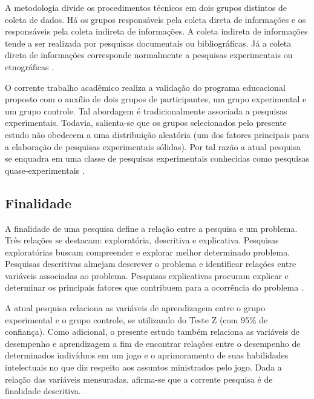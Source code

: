 A metodologia divide os procedimentos técnicos em dois grupos distintos de coleta de dados. Há os grupos responsáveis pela coleta direta de informações e os responsáveis pela coleta indireta de informações. A coleta indireta de informações tende a ser realizada por pesquisas documentais ou bibliográficas. Já a coleta direta de informações corresponde normalmente a pesquisas experimentais ou etnográficas \cite{cordova2009pesquisa}. 

O corrente trabalho acadêmico realiza a validação do programa educacional proposto com o auxílio de dois grupos de participantes, um grupo experimental e um grupo controle. Tal abordagem é tradicionalmente associada a pesquisas experimentais. Todavia, salienta-se que os grupos selecionados pelo presente estudo não obedecem a uma distribuição aleatória (um dos fatores principais para a elaboração de pesquisas experimentais sólidas). %
Por tal razão a atual pesquisa se enquadra em uma classe de pesquisas experimentais conhecidas como pesquisas quase-experimentais .


\subsection{Finalidade}\label{sub:Finalidade}

A  finalidade de uma pesquisa define a relação entre a pesquisa e um problema. Três relações se destacam: exploratória, descritiva e explicativa. Pesquisas exploratórias buscam compreender e explorar melhor determinado problema. Pesquisas descritivas almejam descrever o problema e identificar relações entre variáveis associadas ao problema. Pesquisas explicativas procuram explicar e determinar os principais fatores que contribuem para a ocorrência do problema \cite{trivinos2009introduccao}. 

A atual pesquisa relaciona as variáveis de aprendizagem entre o grupo experimental e o grupo controle, se utilizando do Teste Z (com 95\% de confiança). Como adicional, o presente estudo também relaciona as variáveis de desempenho e aprendizagem a fim de encontrar relações entre o desempenho de determinados indivíduos em um jogo e o aprimoramento de suas habilidades intelectuais no que diz respeito aos assuntos ministrados pelo jogo. Dada a relação das variáveis mensuradas, afirma-se que a corrente pesquisa é de finalidade descritiva.

